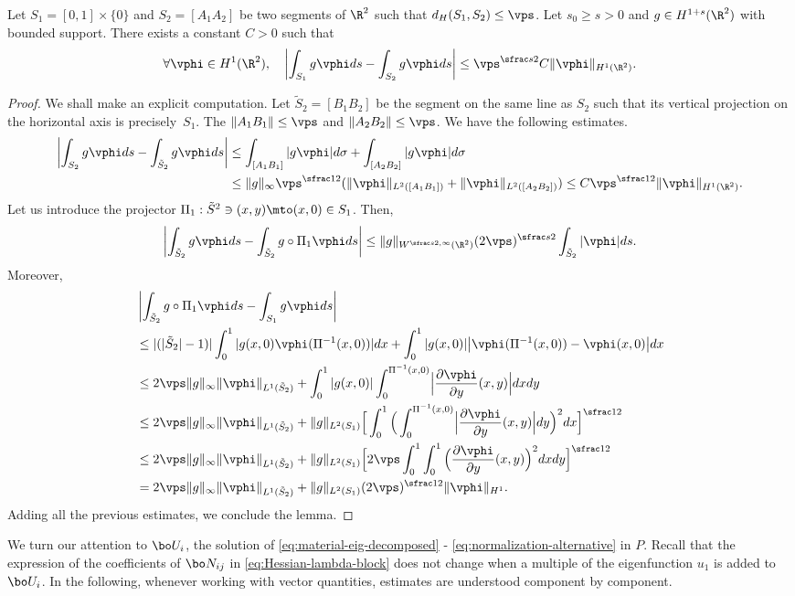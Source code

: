 \begin{lemma}
Let $S_1= [0,1]\times \{0\}$ and $S_2 = [A_1A_2]$ be two segments of $\R^2$ such that $d_H(S_1, S_2) \le \vps$.
Let $s_0\ge s >0$ and $g \in H^{1+s} (\R^2)$ with bounded support. There exists a constant $C>0$ such that
\[
\forall \vphi \in H^1(\R^2), \quad\left|\int_{S_1} g \vphi ds - \int_{S_2} g \vphi ds\right| \le \vps^{\sfrac s2} C \| \vphi \|_{H^1(\R^2)}.
\]
\end{lemma}
\begin{proof}
We shall make an explicit computation. Let $\tilde S_2= [B_1B_2]$ be the segment on the same line as $S_2$ such that its vertical projection on the horizontal axis is precisely~$S_1$. The $\|A_1B_1\| \le \vps$ and $\|A_2B_2\| \le \vps$.
We have the following estimates.
\begin{align*}
\left|\int_{S_2} g \vphi ds - \int_{\tilde S_2} g \vphi ds\right|&\le \int _{[A_1B_1]} |g \vphi |d \sigma + \int _{[A_2B_2]} |g \vphi |d \sigma
\\
&\le \|g \|_\infty \vps^{\sfrac 12}(\| \vphi \|_{L^2([A_1B_1])} + \| \vphi \|_{L^2([A_2B_2])}) \le C\vps^{\sfrac12} \| \vphi \|_{H^1(\R^2)}.
\end{align*}
Let us introduce the projector $\Pi_1: \tilde S^2 \ni (x,y) \mto (x,0)\in S_1$.
Then,
\[
\left|\int_{\tilde S_2} g \vphi ds -\int_{\tilde S_2} g\circ \Pi_1 \vphi ds\right|\le \|g\|_{W^{\sfrac s2, \infty} (\R^2)}(2\vps)^{\sfrac s2} \int _{\tilde S_2} | \vphi | ds.
\]
Moreover,
\begin{align*}&\left|\int_{\tilde S_2} g\circ \Pi_1 \vphi ds -\int_{ S_1} g \vphi ds\right|\\
&\le |(|\tilde S_2|-1)|\int_0^1 |g(x, 0) \vphi (\Pi^{-1} (x,0))| dx+ \int_0^1 |g(x, 0)| \big | \vphi (\Pi^{-1} (x,0))- \vphi (x,0) \big |dx\\
& \le 2 \vps \|g\|_\infty \| \vphi \|_{L^1(\tilde S_2)} + \int_0^1 |g(x, 0) | \int_0^{\Pi^{-1} (x,0)} \Bigl|\frac{\partial \vphi }{\partial y} (x,y)\Bigr|dxdy\\
& \le 2 \vps \|g\|_\infty \| \vphi \|_{L^1(\tilde S_2)} + \|g\|_{L^2(S_1)} \Big [\int_0^1 \Big (\int_0^{\Pi^{-1} (x,0)} \Bigl|\frac{\partial \vphi }{\partial y} (x,y)\Bigr| dy \Big)^2 dx \Big ]^{\sfrac 12}\\
&\le 2 \vps \|g\|_\infty \| \vphi \|_{L^1(\tilde S_2)} + \|g\|_{L^2(S_1)} \Big [ 2\vps \int_0^1 \int_0^1 \Big (\frac{\partial \vphi }{\partial y} (x,y)\Big)^2 dx dy\Big ]^{\sfrac 12}\\
&= 2 \vps \|g\|_\infty \| \vphi \|_{L^1(\tilde S_2)} + \|g\|_{L^2(S_1)} (2\vps)^{\sfrac 12} \| \vphi \|_{H^1}.
\end{align*}
Adding all the previous estimates, we conclude the lemma.
\end{proof}
We turn our attention to $\bo U_i$, the solution of \eqref{eq:material-eig-decomposed} - \eqref{eq:normalization-alternative} in $P$.
Recall that the expression of the coefficients of $\bo N_{ij}$ in \eqref{eq:Hessian-lambda-block} does not change when a multiple of the eigenfunction $u_1$ is added to $\bo U_i$. In the following, whenever working with vector quantities, estimates are understood component by component.

